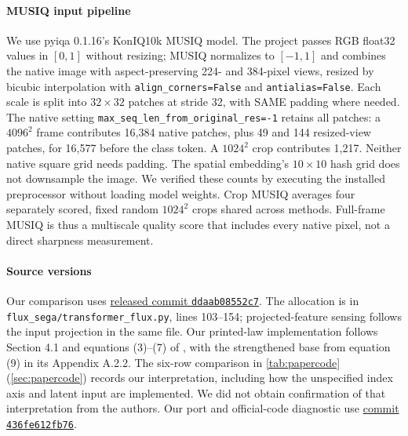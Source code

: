 \paragraph{MUSIQ input pipeline}
We use pyiqa 0.1.16's KonIQ10k MUSIQ model. The project passes RGB float32 values in $[0,1]$ without resizing; MUSIQ normalizes to $[-1,1]$ and combines the native image with aspect-preserving 224- and 384-pixel views, resized by bicubic interpolation with \texttt{align\_corners=False} and \texttt{antialias=False}. Each scale is split into $32\times32$ patches at stride 32, with SAME padding where needed. The native setting \texttt{max\_seq\_len\_from\_original\_res=-1} retains all patches: a $4096^2$ frame contributes 16,384 native patches, plus 49 and 144 resized-view patches, for 16,577 before the class token. A $1024^2$ crop contributes 1,217. Neither native square grid needs padding. The spatial embedding's $10\times10$ hash grid does not downsample the image. We verified these counts by executing the installed preprocessor without loading model weights. Crop MUSIQ averages four separately scored, fixed random $1024^2$ crops shared across methods. Full-frame MUSIQ is thus a multiscale quality score that includes every native pixel, not a direct sharpness measurement.

\paragraph{Source versions}
Our \sega{} comparison uses \href{https://github.com/rajabi2001/sega/tree/ddaab08552c7b7ceba2ebd8f579a0f65dee90b5e}{released commit \texttt{ddaab08552c7}}. The allocation is in \texttt{flux\_sega/transformer\_flux.py}, lines 103--154; projected-feature sensing follows the input projection in the same file. Our printed-law implementation follows Section 4.1 and equations (3)--(7) of \citet{sega2026}, with the strengthened base from equation (9) in its Appendix A.2.2. The six-row comparison in \cref{tab:papercode} (\cref{sec:papercode}) records our interpretation, including how the unspecified index axis and latent input are implemented. We did not obtain confirmation of that interpretation from the authors. Our \dype{} port and official-code diagnostic use \href{https://github.com/guyyariv/DyPE/tree/436fe612fb7695fa2d5dc32d63390c048ba6033c}{commit \texttt{436fe612fb76}}.


